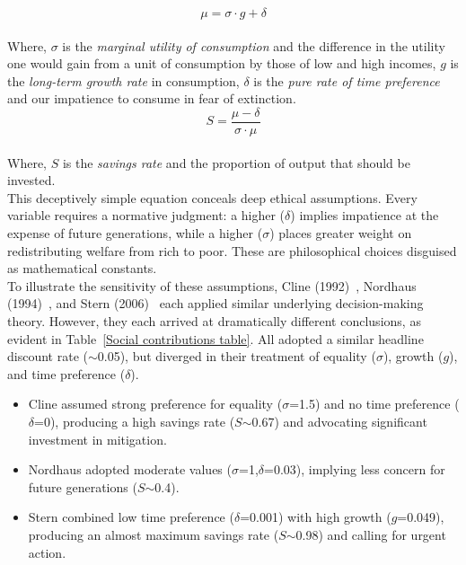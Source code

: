 \documentclass[12pt, oneside]{article}   	%
\begin{document}
\begin{equation}
\mu = \sigma \cdot g + \delta
\end{equation}\\

Where, $\sigma$ is the \emph{marginal utility of consumption} and the difference in the utility one would gain from a unit of consumption by those of low and high incomes, $g$ is the \emph{long-term growth rate} in consumption, $\delta$ is the \emph{pure rate of time preference} and our impatience to consume in fear of extinction.\\

\begin{equation}
S = \frac{\mu-\delta}{\sigma \cdot \mu}
\end{equation}\\

Where, $S$ is the \emph{savings rate} and the proportion of output that should be invested.\\

This deceptively simple equation conceals deep ethical assumptions.
Every variable requires a normative judgment: a higher ($\delta$) implies impatience at the expense of future generations, while a higher ($\sigma$) places greater weight on redistributing welfare from rich to poor.
These are philosophical choices disguised as mathematical constants.\\

To illustrate the sensitivity of these assumptions, Cline (1992)~\cite{wc1}, Nordhaus (1994)~\cite{wn1}, and Stern (2006)~\cite{ns1} each applied similar underlying decision-making theory.
However, they each arrived at dramatically different conclusions, as evident in Table~\ref{Social contributions table}.
All adopted a similar headline discount rate ($\sim$0.05), but diverged in their treatment of equality ($\sigma$), growth ($g$), and time preference ($\delta$).\\

\begin{itemize}
	\item Cline assumed strong preference for equality ($\sigma$=1.5) and no time preference ($\delta$=0), producing a high savings rate ($S$$\sim$0.67) and advocating significant investment in mitigation.
	\item Nordhaus adopted moderate values ($\sigma$=1,$\delta$=0.03), implying less concern for future generations ($S$$\sim$0.4).
	\item Stern combined low time preference ($\delta$=0.001) with high growth ($g$=0.049), producing an almost maximum savings rate ($S$$\sim$0.98) and calling for urgent action.
\end{itemize}
\end{document}

